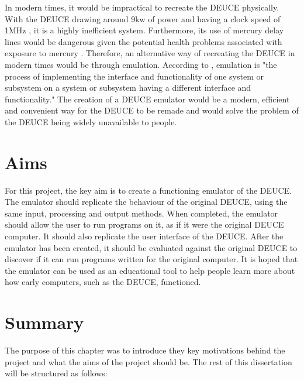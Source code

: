 \documentclass{l4proj}
\begin{document}
In modern times, it would be impractical to recreate the DEUCE physically. With the DEUCE drawing around 9kw of power and having a clock speed of 1MHz \citep{Glasgow60}, it is a highly inefficient system. Furthermore, its use of mercury delay lines would be dangerous given the potential health problems associated with exposure to mercury \citep{Gao17}. Therefore, an alternative way of recreating the DEUCE in modern times would be through emulation. According to \citet{Nair05}, emulation is "the process of implementing the interface and functionality of one system or subsystem on a system or subsystem having a different interface and functionality." The creation of a DEUCE emulator would be a modern, efficient and convenient way for the DEUCE to be remade and would solve the problem of the DEUCE being widely unavailable to people.

\section{Aims}

For this project, the key aim is to create a functioning emulator of the DEUCE. The emulator should replicate the behaviour of the original DEUCE, using the same input, processing and output methods. When completed, the emulator should allow the user to run programs on it, as if it were the original DEUCE computer. It should also replicate the user interface of the DEUCE. After the emulator has been created, it should be evaluated against the original DEUCE to discover if it can run programs written for the original computer. It is hoped that the emulator can be used as an educational tool to help people learn more about how early computers, such as the DEUCE, functioned.

\section{Summary}

The purpose of this chapter was to introduce they key motivations behind the project and what the aims of the project should be. The rest of this dissertation will be structured as follows:
\end{document}
